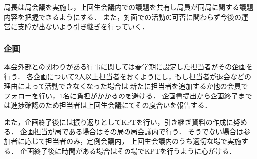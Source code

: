 局長は局会議を実施し，上回生会議内での議題を共有し局員が同局に関する議題内容を把握できるようにする．
また，対面での活動の可否に関わらず今後の運営に支障が出ないよう引き継ぎを行っていく．

\subsubsection*{企画}
本会外部との関わりがある行事に関しては春学期に設定した担当者がその企画を行う．
各企画について2人以上担当者をおくようにし，もし担当者が退会などの理由によって活動できなくなった場合は
新たに担当者を追加するか他の会員でフォローを行い，1名に負担がかかるのを避ける．
企画書提出から企画終了までは進捗確認のため担当者は上回生会議にてその度合いを報告する．

また，企画終了後には振り返りとしてKPTを行い，引き継ぎ資料の作成に努める．
企画担当が局である場合はその局の局会議内で行う．
そうでない場合は参加者に応じて担当者のみ，定例会議内，
上回生会議内のうち適切な場で実施する．
企画終了後に時間がある場合はその場でKPTを行うように心がける．

